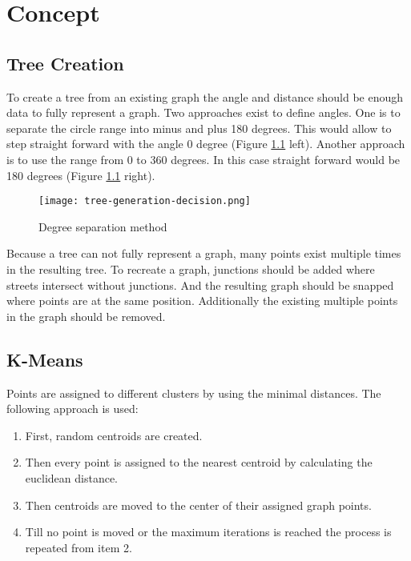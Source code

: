 \chapter{Concept}
\section{Tree Creation}
To create a tree from an existing graph the angle and distance should be enough data to fully represent a graph.
Two approaches exist to define angles. One is to separate the circle range into minus and plus 180 degrees. This would allow to step straight forward with the angle 0 degree (Figure \ref{fig:tree-generation-decision} left). Another approach is to use the range from 0 to 360 degrees. In this case straight forward would be 180 degrees (Figure \ref{fig:tree-generation-decision} right).

\begin{figure}[!ht]
    \centering
    \texttt{[image: tree-generation-decision.png]}
    \caption{Degree separation method \label{fig:tree-generation-decision}}
\end{figure}

Because a tree can not fully represent a graph, many points exist multiple times in the resulting tree. To recreate a graph, junctions should be added where streets intersect without junctions. And the resulting graph should be snapped where points are at the same position. Additionally the existing multiple points in the graph should be removed.

\FloatBarrier
\pagebreak
\section{K-Means}
Points are assigned to different clusters by using the minimal distances. The following approach is used:

\begin{enumerate}
    \item First, random centroids are created.
    \item Then every point is assigned to the nearest centroid by calculating the euclidean distance.
    \item Then centroids are moved to the center of their assigned graph points.
    \item Till no point is moved or the maximum iterations is reached the process is repeated from item 2.
\end{enumerate}

